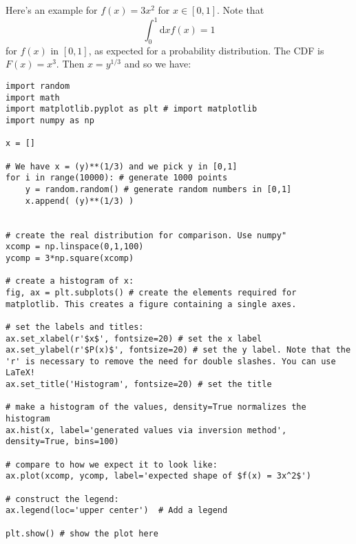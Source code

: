 \documentclass[../../../main.tex]{subfiles}
\begin{document}
Here's an example for $f(x)=3x^2$ for $x \in [0,1]$.
Note that
\begin{equation*}
    \int_0^1 \mathrm{d} x f(x)= 1
\end{equation*}
for $f(x)$ in $[0,1]$, as expected for a probability distribution.
The CDF is $F(x) = x^3$.
Then $x = y^{1/3}$ and so we have:
\begin{verbatim}
import random 
import math
import matplotlib.pyplot as plt # import matplotlib
import numpy as np

x = []

# We have x = (y)**(1/3) and we pick y in [0,1] 
for i in range(10000): # generate 1000 points
    y = random.random() # generate random numbers in [0,1]
    x.append( (y)**(1/3) )


# create the real distribution for comparison. Use numpy"
xcomp = np.linspace(0,1,100)
ycomp = 3*np.square(xcomp)
    
# create a histogram of x:
fig, ax = plt.subplots() # create the elements required for matplotlib. This creates a figure containing a single axes.

# set the labels and titles:
ax.set_xlabel(r'$x$', fontsize=20) # set the x label
ax.set_ylabel(r'$P(x)$', fontsize=20) # set the y label. Note that the 'r' is necessary to remove the need for double slashes. You can use LaTeX! 
ax.set_title('Histogram', fontsize=20) # set the title 

# make a histogram of the values, density=True normalizes the histogram
ax.hist(x, label='generated values via inversion method', density=True, bins=100) 

# compare to how we expect it to look like:
ax.plot(xcomp, ycomp, label='expected shape of $f(x) = 3x^2$')

# construct the legend:
ax.legend(loc='upper center')  # Add a legend

plt.show() # show the plot here
\end{verbatim}
\end{document}
